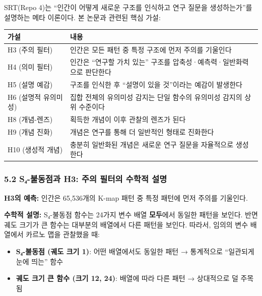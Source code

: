 \documentclass[
]{article}
\newcounter{none} %
\providecommand{\tightlist}{%
  \setlength{\itemsep}{0pt}\setlength{\parskip}{0pt}}
\begin{document}
SRT(Repo 4)는 ``인간이 어떻게 새로운 구조를 인식하고 연구 질문을
생성하는가''를 설명하는 메타 이론이다. 본 논문과 관련된 핵심 가설:

{\def\LTcaptype{none} %
\begin{longtable}[]{@{}
  >{\raggedright\arraybackslash}p{}
  >{\raggedright\arraybackslash}p{}@{}}
\toprule\noalign{}
\begin{minipage}[b]{\linewidth}\raggedright
가설
\end{minipage} & \begin{minipage}[b]{\linewidth}\raggedright
내용
\end{minipage} \\
\midrule\noalign{}
\endhead
\bottomrule\noalign{}
\endlastfoot
H3 (주의 필터) & 인간은 모든 패턴 중 특정 구조에 먼저 주의를 기울인다 \\
H4 (의미 필터) & 인간은 ``연구할 가치 있는'' 구조를
압축성·예측력·일반화력으로 판단한다 \\
H5 (설명 예감) & 구조를 인식한 후 ``설명이 있을 것''이라는 예감이
발생한다 \\
H6 (설명적 유의미성) & 집합 전체의 유의미성 감지는 단일 함수의 유의미성
감지의 상위 수준이다 \\
H8 (개념-렌즈) & 획득한 개념이 이후 관찰의 렌즈가 된다 \\
H9 (개념 진화) & 개념은 연구를 통해 더 일반적인 형태로 진화한다 \\
H10 (생성적 개념) & 충분히 일반화된 개념은 새로운 연구 질문을 자율적으로
생성한다 \\
\end{longtable}
}

\subsubsection{5.2 S₄-불동점과 H3: 주의 필터의 수학적
설명}\label{sux2084-uxbd88uxb3d9uxc810uxacfc-h3-uxc8fcuxc758-uxd544uxd130uxc758-uxc218uxd559uxc801-uxc124uxba85}

\textbf{H3의 예측:} 인간은 65,536개의 K-map 패턴 중 특정 패턴에 먼저
주의를 기울인다.

\textbf{수학적 설명:} S₄-불동점 함수는 24가지 변수 배열
\textbf{모두}에서 동일한 패턴을 보인다. 반면 궤도 크기가 큰 함수는
대부분의 배열에서 다른 패턴을 보인다. 따라서, 임의의 변수 배열에서
카르노 맵을 관찰했을 때:

\begin{itemize}
\tightlist
\item
  \textbf{S₄-불동점 (궤도 크기 1)}: 어떤 배열에서도 동일한 패턴 →
  통계적으로 ``일관되게 눈에 띄는'' 함수
\item
  \textbf{궤도 크기 큰 함수 (크기 12, 24)}: 배열에 따라 다른 패턴 →
  상대적으로 덜 주목됨
\end{itemize}
\end{document}

